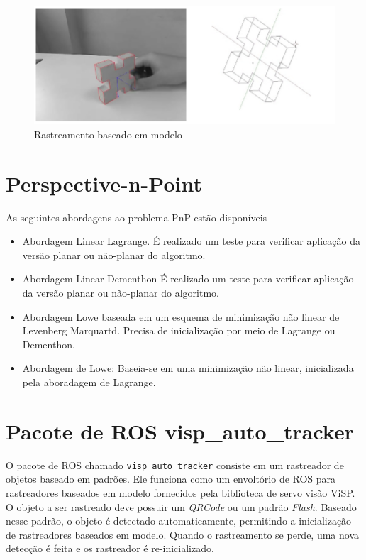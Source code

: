 \begin{figure}[!ht]
\centering
  \includegraphics[width=\linewidth]{./img/visp.png}
  \caption{Rastreamento baseado em modelo}
  \label{fig:cenpes_doris}
\end{figure}%

\section{Perspective-n-Point}
As seguintes abordagens ao problema PnP estão disponíveis
\begin{itemize}
\item Abordagem Linear Lagrange. É realizado um teste para verificar aplicação da versão planar ou não-planar do algoritmo. 

\item Abordagem Linear Dementhon \citep{dementhon1995model, oberkampf1996iterative}  É realizado um teste para verificar aplicação da versão planar ou não-planar do algoritmo. 
	
\item Abordagem Lowe baseada em um esquema de minimização não linear de Levenberg Marquartd. Precisa de inicialização por meio de Lagrange ou Dementhon.

\item  Abordagem de Lowe: Baseia-se em uma minimização não linear, inicializada pela aboradagem de Lagrange.
\end{itemize}

\section{Pacote de ROS visp\_auto\_tracker}
O pacote de ROS chamado \verb|visp_auto_tracker| consiste em um rastreador de objetos baseado em padrões. Ele funciona como um envoltório de ROS para rastreadores baseados em modelo fornecidos pela biblioteca de servo visão ViSP. O objeto a ser rastreado deve possuir um \textit{QRCode} ou um padrão \textit{Flash}. Baseado nesse padrão, o objeto é detectado automaticamente, permitindo a inicialização de rastreadores baseados em modelo. Quando o rastreamento se perde, uma nova detecção é feita e os rastreador é re-inicializado.

